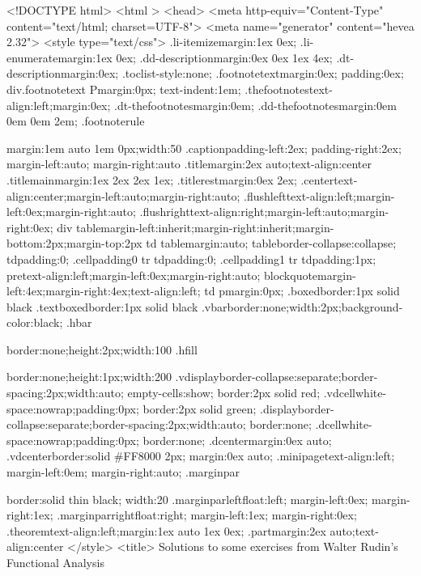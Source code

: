 <!DOCTYPE html>
<html >
<head>
<meta http-equiv="Content-Type" content="text/html; charset=UTF-8">
<meta name="generator" content="hevea 2.32">
<style type="text/css">
.li-itemize{margin:1ex 0ex;}
.li-enumerate{margin:1ex 0ex;}
.dd-description{margin:0ex 0ex 1ex 4ex;}
.dt-description{margin:0ex;}
.toc{list-style:none;}
.footnotetext{margin:0ex; padding:0ex;}
div.footnotetext P{margin:0px; text-indent:1em;}
.thefootnotes{text-align:left;margin:0ex;}
.dt-thefootnotes{margin:0em;}
.dd-thefootnotes{margin:0em 0em 0em 2em;}
.footnoterule{margin:1em auto 1em 0px;width:50%
.caption{padding-left:2ex; padding-right:2ex; margin-left:auto; margin-right:auto}
.title{margin:2ex auto;text-align:center}
.titlemain{margin:1ex 2ex 2ex 1ex;}
.titlerest{margin:0ex 2ex;}
.center{text-align:center;margin-left:auto;margin-right:auto;}
.flushleft{text-align:left;margin-left:0ex;margin-right:auto;}
.flushright{text-align:right;margin-left:auto;margin-right:0ex;}
div table{margin-left:inherit;margin-right:inherit;margin-bottom:2px;margin-top:2px}
td table{margin:auto;}
table{border-collapse:collapse;}
td{padding:0;}
.cellpadding0 tr td{padding:0;}
.cellpadding1 tr td{padding:1px;}
pre{text-align:left;margin-left:0ex;margin-right:auto;}
blockquote{margin-left:4ex;margin-right:4ex;text-align:left;}
td p{margin:0px;}
.boxed{border:1px solid black}
.textboxed{border:1px solid black}
.vbar{border:none;width:2px;background-color:black;}
.hbar{border:none;height:2px;width:100%
.hfill{border:none;height:1px;width:200%
.vdisplay{border-collapse:separate;border-spacing:2px;width:auto; empty-cells:show; border:2px solid red;}
.vdcell{white-space:nowrap;padding:0px; border:2px solid green;}
.display{border-collapse:separate;border-spacing:2px;width:auto; border:none;}
.dcell{white-space:nowrap;padding:0px; border:none;}
.dcenter{margin:0ex auto;}
.vdcenter{border:solid #FF8000 2px; margin:0ex auto;}
.minipage{text-align:left; margin-left:0em; margin-right:auto;}
.marginpar{border:solid thin black; width:20%
.marginparleft{float:left; margin-left:0ex; margin-right:1ex;}
.marginparright{float:right; margin-left:1ex; margin-right:0ex;}
.theorem{text-align:left;margin:1ex auto 1ex 0ex;}
.part{margin:2ex auto;text-align:center}
</style>
<title>
Solutions to some exercises from Walter Rudin's Functional Analysis

}}}}

